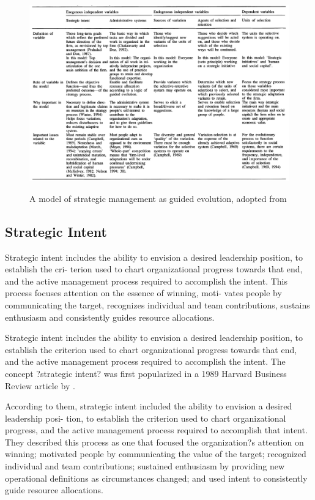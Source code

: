 \documentclass[12pt,letterpaper]{article}
\begin{document}
\begin{figure}[h]
\begin{centering}
  \caption{A model of strategic management as guided evolution, adopted from \cite{Lovas2000}}
  \includegraphics[width=\textwidth]{Lovas2000b}
  \label{fig:Lovas2000b}
\end{centering}
\end{figure}

\subsection{Strategic Intent}
Strategic intent includes the ability to envision a desired leadership position, to establish the cri- terion used to chart organizational progress towards that end, and the active management process required to accomplish the intent. This process focuses attention on the essence of winning, moti- vates people by communicating the target, recognizes individual and team contributions, sustains enthusiasm and consistently guides resource allocations.

Strategic intent includes the ability to envision a desired leadership position, to establish the criterion used to chart organizational progress towards that end, and the active management process required to accomplish the intent. The concept ?strategic intent? was first popularized in a 1989 Harvard Business Review article by \cite{Hamel1989}.

According to them, strategic intent included the ability to envision a desired leadership posi- tion, to establish the criterion used to chart organizational progress, and the active management process required to accomplish that intent. They described this process as one that focused the organization?s attention on winning; motivated people by communicating the value of the target; recognized individual and team contributions; sustained enthusiasm by providing new operational definitions as circumstances changed; and used intent to consistently guide resource allocations.
\end{document}
